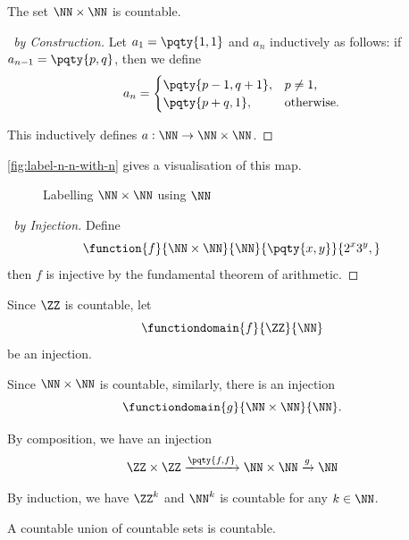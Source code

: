 \begin{theorem}
    The set \(\NN \times \NN\) is countable.
\end{theorem}

\begin{proof}[\proofname\ by Construction]
    Let \(a_1 = \pqty{1, 1}\) and \(a_n\) inductively as follows: if \(a_{n - 1} = \pqty{p, q}\), then we define
    \[
        a_n = \begin{cases}
            \pqty{p - 1, q + 1}, & p \neq 1, \\
            \pqty{p + q, 1}, & \text{otherwise}.
        \end{cases}
    \]

    This inductively defines \(a: \NN \to \NN \times \NN\).
\end{proof}

\autoref{fig:label-n-n-with-n} gives a visualisation of this map.

\begin{figure}[ht!]
    \centering
    \caption{Labelling \(\NN \times \NN\) using \(\NN\)}
    \label{fig:label-n-n-with-n}
\end{figure}

\begin{proof}[\proofname\ by Injection]
    Define
    \[
        \function{f}{\NN \times \NN}{\NN}{\pqty{x, y}}{2^x 3^y,}
    \]
    then \(f\) is injective by the fundamental theorem of arithmetic.
\end{proof}

\begin{corollary}
    Since \(\ZZ\) is countable, let
    \[
        \functiondomain{f}{\ZZ}{\NN}
    \]
    be an injection.

    Since \(\NN \times \NN\) is countable, similarly, there is an injection
    \[
        \functiondomain{g}{\NN \times \NN}{\NN}.
    \]
    
    By composition, we have an injection
    \[
        \ZZ \times \ZZ \xrightarrow{\pqty{f, f}} \NN \times \NN \xrightarrow{g} \NN
    \]
\end{corollary}

By induction, we have \(\ZZ^k\) and \(\NN^k\) is countable for any \(k \in \NN\).

\begin{theorem}
    A countable union of countable sets is countable.
\end{theorem}

